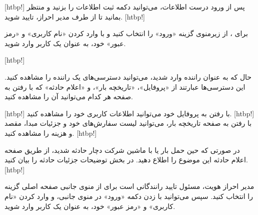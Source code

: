     [htbp!]
 پس از ورود درست اطلاعات، می‌توانید دکمه ثبت اطلاعات را بزنید و منتظر بمانید تا از طرف مدیر احراز، تایید شوید.
[htbp!]

 
         برای ، از زیرمنوی  گزینه «ورود» را انتخاب کنید و با وارد کردن «نام کاربری» و «رمز عبور» خود، به عنوان یک کاربر  وارد شوید.

    [htbp!]

     حال که به عنوان راننده وارد شدید، می‌توانید دسترسی‌های یک راننده را مشاهده کنید. این دسترسی‌ها عبارتند از «پروفایل»، «تاریخچه بار»، و «اعلام حادثه» که با رفتن به صفحه هر کدام می‌توانید آن را مشاهده کنید.

    [htbp!]
         با رفتن به پروفایل خود می‌توانید اطلاعات کاربری خود را مشاهده کنید.
    [htbp!]
     با رفتن به صفحه تاریخچه بار، می‌توانید لیست سفارش‌های خود و جزئیات مبدا، مقصد و هزینه را مشاهده کنید.
\newpage
                [htbp!]

     در صورتی که حین حمل بار یا با ماشین شرکت دچار حادثه شدید، از طریق صفحه اعلام حادثه این موضوع را اطلاع دهید. در بخش توضیحات جزئیات حادثه را بیان کنید.
                [htbp!]

     
             مدیر احراز هویت، مسئول تایید رانندگانی است  برای  از منوی جانبی صفحه اصلی گزینه  را انتخاب کنید. سپس می‌توانید با زدن دکمه «ورود» در منوی جانبی، و وارد کردن «نام کاربری» و «رمز عبور» خود، به عنوان یک کاربر  وارد شوید.

